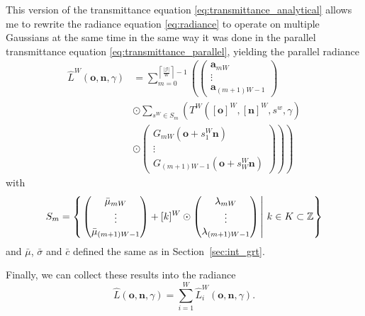 \documentclass[a4paper, 11pt]{memoir}
\begin{document}
    This version of the \gls{transmittance} equation \eqref{eq:transmittance_analytical} allows me to rewrite the
    \gls{radiance} equation \eqref{eq:radiance} to operate on multiple Gaussians at the same time in the same way it
    was done in the parallel \gls{transmittance} equation \eqref{eq:transmittance_parallel}, yielding the parallel \gls{radiance}
    \begin{equation}
        \begin{aligned}
            \hat{L}^W(\mathbf{o}, \mathbf{n}, \gamma) &= \sum_{m = 0}^{\left\lceil \frac{|\mathcal{G}|}{W} \right\rceil - 1} \left( \begin{pmatrix}
                \mathbf{a}_{mW}\\ \vdots \\ \mathbf{a}_{(m+1)W - 1}
            \end{pmatrix} \right.\\
            &\odot \sum_{s^W \in S_m} \left( T^W([\mathbf{o}]^W, [\mathbf{n}]^W, s^w, \gamma)\right.\\
            &\odot \left.\left.\begin{pmatrix}
                G_{mW}(\mathbf{o} + s^W_1\mathbf{n})\\ \vdots\\ G_{(m+1)W - 1}(\mathbf{o} + s^W_W\mathbf{n})
            \end{pmatrix}\right)\right)
        \end{aligned}
        \label{eq:radiance_parallel_gaussians}
    \end{equation}
    with
    \[ S_m = \left\{\left. \begin{pmatrix}
        \bar{\mu}_{mW}\\ \vdots\\ \bar{\mu}_{(m+1)W - 1}
    \end{pmatrix} + [k]^W \odot \begin{pmatrix}
        \lambda_{mW}\\ \vdots\\ \lambda_{(m+1)W - 1}
    \end{pmatrix} \,\right|\, k \in K \subset \mathbb{Z} \right\} \]
    and $\bar{\mu}$, $\bar{\sigma}$ and $\bar{c}$ defined the same as in Section~\ref{sec:int_grt}.

    Finally, we can collect these results into the \gls{radiance}
    \begin{equation}
        \hat{L}(\mathbf{o}, \mathbf{n}, \gamma) = \sum_{i = 1}^W \hat{L}^W_i(\mathbf{o}, \mathbf{n}, \gamma).
        \label{eq:radiance_parallel_final}
    \end{equation}
\end{document}
